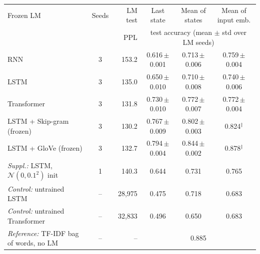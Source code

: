 \begin{tabular}{lcrccc}
\toprule
Frozen LM & Seeds & LM test & Last state & Mean of states & Mean of input emb. \\
 & & PPL & \multicolumn{3}{c}{test accuracy (mean $\pm$ std over LM seeds)} \\
\midrule
RNN & 3 & 153.2 & 0.616\,{\scriptsize$\pm$0.001} & 0.713\,{\scriptsize$\pm$0.006} & 0.759\,{\scriptsize$\pm$0.004} \\
LSTM & 3 & 135.0 & 0.650\,{\scriptsize$\pm$0.010} & 0.710\,{\scriptsize$\pm$0.008} & 0.740\,{\scriptsize$\pm$0.006} \\
Transformer & 3 & 131.8 & 0.730\,{\scriptsize$\pm$0.010} & 0.772\,{\scriptsize$\pm$0.007} & 0.772\,{\scriptsize$\pm$0.004} \\
LSTM + Skip-gram (frozen) & 3 & 130.2 & 0.767\,{\scriptsize$\pm$0.009} & 0.802\,{\scriptsize$\pm$0.003} & 0.824$^\ddagger$ \\
LSTM + GloVe (frozen) & 3 & 132.7 & 0.794\,{\scriptsize$\pm$0.004} & 0.844\,{\scriptsize$\pm$0.002} & 0.878$^\ddagger$ \\
\midrule
\textit{Suppl.:} LSTM, $\mathcal{N}(0,0.1^2)$ init & 1 & 140.3 & 0.644 & 0.731 & 0.765 \\
\textit{Control:} untrained LSTM & -- & 28,975 & 0.475 & 0.718 & 0.683 \\
\textit{Control:} untrained Transformer & -- & 32,833 & 0.496 & 0.650 & 0.683 \\
\midrule
\textit{Reference:} TF-IDF bag of words, no LM & -- & -- & \multicolumn{3}{c}{0.885} \\
\bottomrule
\end{tabular}
